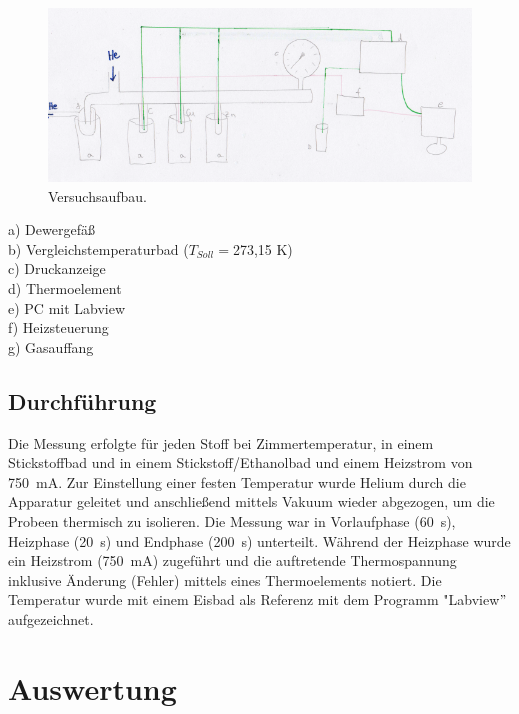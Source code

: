\documentclass[12pt,a4paper,titlepage,headinclude,bibtotoc]{scrartcl}
\begin{document}
\begin{figure} [h!]
\begin{center}
\includegraphics[scale=0.9]{VersuchsaufbauZeichnung.png} \end{center}
\caption{Versuchsaufbau.}
\end{figure}

a) Dewergefäß\\
b) Vergleichstemperaturbad ($T_{Soll}=$273,15 K)\\
c) Druckanzeige\\
d) Thermoelement\\
e) PC mit Labview\\
f) Heizsteuerung\\
g) Gasauffang\\
\subsection{Durchführung}
Die Messung erfolgte für jeden Stoff bei Zimmertemperatur, in einem Stickstoffbad und in einem Stickstoff/Ethanolbad und einem Heizstrom von 750~mA. Zur Einstellung einer festen Temperatur wurde Helium durch die Apparatur geleitet und anschließend mittels Vakuum wieder abgezogen, um die Probeen thermisch zu isolieren. Die Messung war in Vorlaufphase (60~s), Heizphase (20~s) und Endphase (200~s) unterteilt. Während der Heizphase wurde ein Heizstrom (750~mA) zugeführt und die auftretende Thermospannung inklusive Änderung (Fehler) mittels eines Thermoelements notiert. Die Temperatur wurde mit einem Eisbad als Referenz mit dem Programm "Labview$"$ aufgezeichnet.\\
\section{Auswertung}
\end{document}
